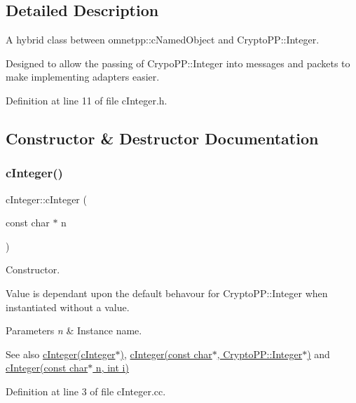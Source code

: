 \subsection{Detailed Description}
A hybrid class between omnetpp\+::c\+Named\+Object and Crypto\+P\+P\+::\+Integer. 

Designed to allow the passing of Crypo\+P\+P\+::\+Integer into messages and packets to make implementing adapters easier. 

Definition at line 11 of file c\+Integer.\+h.



\subsection{Constructor \& Destructor Documentation}
\mbox{\label{classcInteger_afc876143cbe434def0b5851a98bc3ae8}} 
\subsubsection{\texorpdfstring{c\+Integer()}{cInteger()}\hspace{0.1cm}{\footnotesize\ttfamily [1/4]}}
{\footnotesize\ttfamily c\+Integer\+::c\+Integer (\begin{DoxyParamCaption}\item[{const char $\ast$}]{n }\end{DoxyParamCaption})}



Constructor. 

Value is dependant upon the default behavour for Crypto\+P\+P\+::\+Integer when instantiated without a value. 
\begin{DoxyParams}{Parameters}
{\em n} & Instance name. \\
\hline
\end{DoxyParams}
\begin{DoxySeeAlso}{See also}
\hyperlink{classcInteger_ad47b8fb0711aefe0d10fa8903d8ed6ca}{c\+Integer(c\+Integer$\ast$)}, \hyperlink{classcInteger_a31669ca6b9b7f41f906320aaee8c8082}{c\+Integer(const char$\ast$, Crypto\+P\+P\+::\+Integer$\ast$)} and \hyperlink{classcInteger_aca26b0880fd20e8a87dbb435f29af348}{c\+Integer(const char$\ast$ n, int i)} 
\end{DoxySeeAlso}


Definition at line 3 of file c\+Integer.\+cc.

